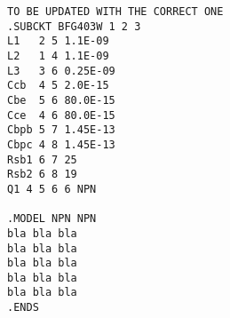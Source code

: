 \begin{verbatim}
TO BE UPDATED WITH THE CORRECT ONE
.SUBCKT BFG403W 1 2 3 
L1   2 5 1.1E-09
L2   1 4 1.1E-09
L3   3 6 0.25E-09
Ccb  4 5 2.0E-15
Cbe  5 6 80.0E-15
Cce  4 6 80.0E-15
Cbpb 5 7 1.45E-13 
Cbpc 4 8 1.45E-13 
Rsb1 6 7 25 
Rsb2 6 8 19 
Q1 4 5 6 6 NPN 

.MODEL NPN NPN 
bla bla bla
bla bla bla
bla bla bla
bla bla bla
bla bla bla
.ENDS

\end{verbatim}